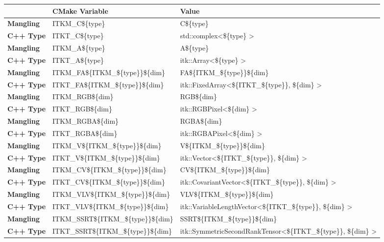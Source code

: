 \begin{table}
\begin{center}
  \small
  \begin{tabular}{l p{} p{}}
\toprule
& \textbf{CMake Variable} & \textbf{Value} \\
\midrule
\midrule
\textbf{Mangling} & ITKM\_C\$\{type\} & C\$\{type\} \\
\textbf{C++ Type} & ITKT\_C\$\{type\} & std::complex\textless \$\{type\} \textgreater\\
\midrule
\textbf{Mangling} & ITKM\_A\$\{type\} & A\$\{type\} \\
\textbf{C++ Type} & ITKT\_A\$\{type\} & itk::Array\textless \$\{type\} \textgreater\\
\midrule
\textbf{Mangling} & ITKM\_FA\$\{ITKM\_\$\{type\}\}\$\{dim\} & FA\$\{ITKM\_\$\{type\}\}\$\{dim\} \\
\textbf{C++ Type} & ITKT\_FA\$\{ITKM\_\$\{type\}\}\$\{dim\} & itk::FixedArray\textless \$\{ITKT\_\$\{type\}\}, \$\{dim\} \textgreater \\
\midrule
\textbf{Mangling} & ITKM\_RGB\$\{dim\} & RGB\$\{dim\} \\
\textbf{C++ Type} & ITKT\_RGB\$\{dim\} & itk::RGBPixel\textless \$\{dim\} \textgreater\\
\midrule
\textbf{Mangling} & ITKM\_RGBA\$\{dim\} & RGBA\$\{dim\} \\
\textbf{C++ Type} & ITKT\_RGBA\$\{dim\} & itk::RGBAPixel\textless \$\{dim\} \textgreater\\
\midrule
\textbf{Mangling} & ITKM\_V\$\{ITKM\_\$\{type\}\}\$\{dim\} & V\$\{ITKM\_\$\{type\}\}\$\{dim\} \\
\textbf{C++ Type} & ITKT\_V\$\{ITKM\_\$\{type\}\}\$\{dim\} & itk::Vector\textless \$\{ITKT\_\$\{type\}\}, \$\{dim\} \textgreater \\
\midrule
\textbf{Mangling} & ITKM\_CV\$\{ITKM\_\$\{type\}\}\$\{dim\} & CV\$\{ITKM\_\$\{type\}\}\$\{dim\} \\
\textbf{C++ Type} & ITKT\_CV\$\{ITKM\_\$\{type\}\}\$\{dim\} & itk::CovariantVector\textless \$\{ITKT\_\$\{type\}\}, \$\{dim\} \textgreater \\
\midrule
\textbf{Mangling} & ITKM\_VLV\$\{ITKM\_\$\{type\}\}\$\{dim\} & VLV\$\{ITKM\_\$\{type\}\}\$\{dim\} \\
\textbf{C++ Type} & ITKT\_VLV\$\{ITKM\_\$\{type\}\}\$\{dim\} & itk::VariableLengthVector\textless \$\{ITKT\_\$\{type\}\}, \$\{dim\} \textgreater \\
\midrule
\textbf{Mangling} & ITKM\_SSRT\$\{ITKM\_\$\{type\}\}\$\{dim\} & SSRT\$\{ITKM\_\$\{type\}\}\$\{dim\} \\
\textbf{C++ Type} & ITKT\_SSRT\$\{ITKM\_\$\{type\}\}\$\{dim\} & itk::SymmetricSecondRankTensor\textless \$\{ITKT\_\$\{type\}\}, \$\{dim\} \textgreater \\
\bottomrule
\end{tabular}
\end{center}
%
\label{tab:WrappingManglingOtherITKPixelTypes}
\end{table}


